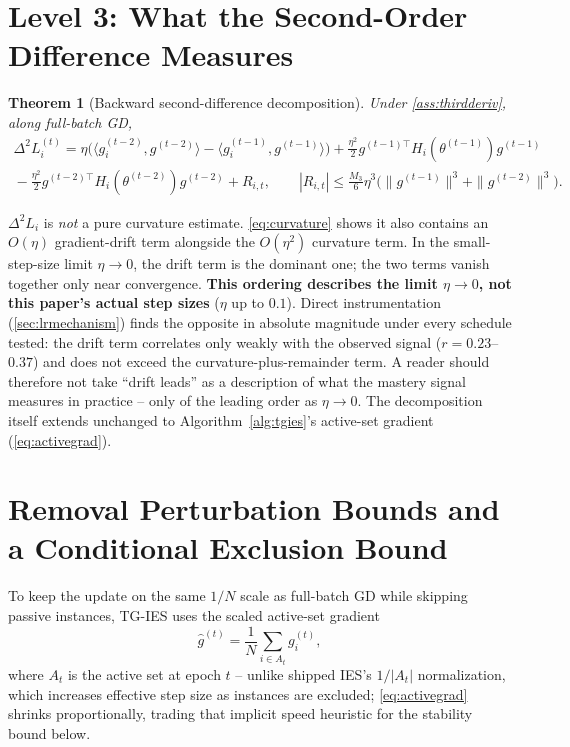 \documentclass{article}
\theoremstyle{plain}
\newtheorem{theorem}{Theorem}[section]
\theoremstyle{definition}
\theoremstyle{remark}
\begin{document}
\section{Level 3: What the Second-Order Difference Measures}
\label{sec:level3}

\begin{theorem}[Backward second-difference decomposition]
\label{thm:curvature}
Under \cref{ass:thirdderiv}, along full-batch GD,
\begin{multline}
\label{eq:curvature}
\Delta^2 L_i^{(t)} = \eta\Big(\langle g_i^{(t-2)},g^{(t-2)}\rangle - \langle g_i^{(t-1)},g^{(t-1)}\rangle\Big)
{}+ \frac{\eta^2}{2}g^{(t-1)\top}H_i(\theta^{(t-1)})g^{(t-1)} \\
{}- \frac{\eta^2}{2}g^{(t-2)\top}H_i(\theta^{(t-2)})g^{(t-2)} + R_{i,t},\qquad
|R_{i,t}| \le \tfrac{M_3}{6}\eta^3\big(\|g^{(t-1)}\|^3+\|g^{(t-2)}\|^3\big).
\end{multline}
\end{theorem}
$\Delta^2 L_i$ is \emph{not} a pure curvature estimate. \cref{eq:curvature} shows it also contains an $O(\eta)$ gradient-drift term alongside the $O(\eta^2)$ curvature term. In the small-step-size limit $\eta\to0$, the drift term is the dominant one; the two terms vanish together only near convergence. \textbf{This ordering describes the limit $\eta\to0$, not this paper's actual step sizes} ($\eta$ up to $0.1$). Direct instrumentation (\cref{sec:lrmechanism}) finds the opposite in absolute magnitude under every schedule tested: the drift term correlates only weakly with the observed signal ($r{=}0.23$--$0.37$) and does not exceed the curvature-plus-remainder term. A reader should therefore not take ``drift leads'' as a description of what the mastery signal measures in practice -- only of the leading order as $\eta\to0$. The decomposition itself extends unchanged to Algorithm~\ref{alg:tgies}'s active-set gradient (\cref{eq:activegrad}).

\section{Removal Perturbation Bounds and a Conditional Exclusion Bound}
\label{sec:level4}

To keep the update on the same $1/N$ scale as full-batch GD while skipping passive instances, TG-IES uses the scaled active-set gradient
\begin{equation}
\label{eq:activegrad}
\hat g^{(t)} = \frac1N \sum_{i\in A_t} g_i^{(t)},
\end{equation}
where $A_t$ is the active set at epoch $t$ -- unlike shipped IES's $1/|A_t|$ normalization, which increases effective step size as instances are excluded; \cref{eq:activegrad} shrinks proportionally, trading that implicit speed heuristic for the stability bound below.
\end{document}
